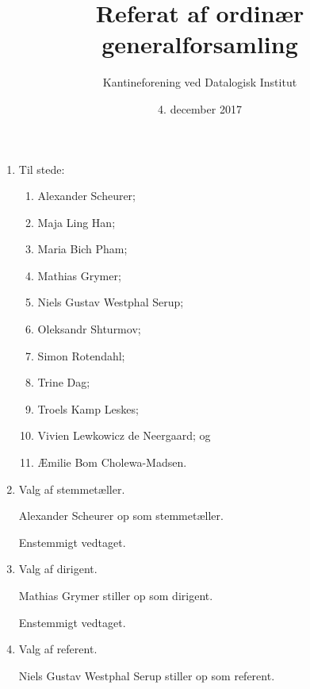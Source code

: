 \documentclass[a4paper]{article}
\title{Referat af ordinær generalforsamling}
\author{Kantineforening ved Datalogisk Institut}
\date{4. december 2017}
\begin{document}
\maketitle

\thispagestyle{fancy}


\begin{enumerate}

\item[\textsection 1] Til stede:

\begin{enumerate}

\item Alexander Scheurer;

\item Maja Ling Han;

\item Maria Bich Pham;

\item Mathias Grymer;

\item Niels Gustav Westphal Serup;

\item Oleksandr Shturmov;

\item Simon Rotendahl;

\item Trine Dag;

\item Troels Kamp Leskes;

\item Vivien Lewkowicz de Neergaard; og

\item Æmilie Bom Cholewa-Madsen.

\end{enumerate}


\item[\textsection 2] Valg af stemmetæller.

Alexander Scheurer op som stemmetæller.

Enstemmigt vedtaget.


\item[\textsection 3] Valg af dirigent.

Mathias Grymer stiller op som dirigent.

Enstemmigt vedtaget.


\item[\textsection 4] Valg af referent.

Niels Gustav Westphal Serup stiller op som referent.


\end{enumerate}
\end{document}
